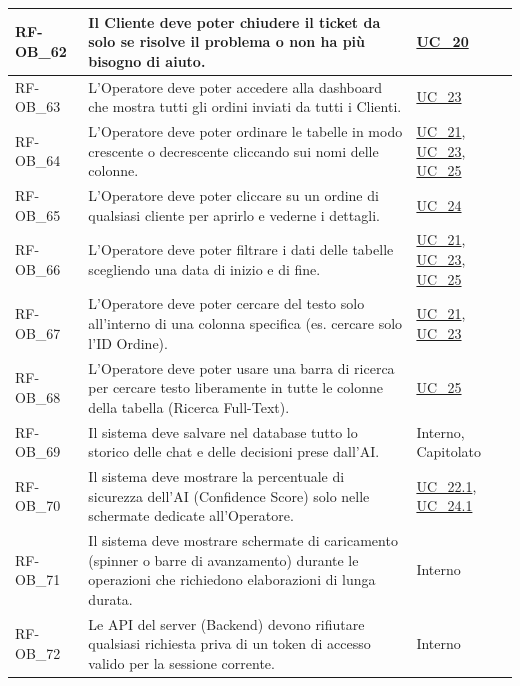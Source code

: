 \begin{longtable}{|>{\raggedright}p{}|>{\raggedright\arraybackslash}p{}|>{\raggedright\arraybackslash}p{}|}
    \hline
    RF-OB\_62 \hypertarget{rf-ob_62} & Il Cliente deve poter chiudere il ticket da solo se risolve il problema o non ha più bisogno di aiuto. & \hyperref[uc_20]{UC\_20} \\
    \hline
    RF-OB\_63 \hypertarget{rf-ob_63} & L'Operatore deve poter accedere alla dashboard che mostra tutti gli ordini inviati da tutti i Clienti. & \hyperref[uc_23]{UC\_23} \\
    \hline
    RF-OB\_64 \hypertarget{rf-ob_64} & L'Operatore deve poter ordinare le tabelle in modo crescente o decrescente cliccando sui nomi delle colonne. & \hyperref[uc_21]{UC\_21}, \hyperref[uc_23]{UC\_23}, \hyperref[uc_25]{UC\_25} \\
    \hline
    RF-OB\_65 \hypertarget{rf-ob_65} & L'Operatore deve poter cliccare su un ordine di qualsiasi cliente per aprirlo e vederne i dettagli. & \hyperref[uc_24]{UC\_24} \\
    \hline
    RF-OB\_66 \hypertarget{rf-ob_66} & L'Operatore deve poter filtrare i dati delle tabelle scegliendo una data di inizio e di fine. & \hyperref[uc_21]{UC\_21}, \hyperref[uc_23]{UC\_23}, \hyperref[uc_25]{UC\_25} \\
    \hline
    RF-OB\_67 \hypertarget{rf-ob_67} & L'Operatore deve poter cercare del testo solo all'interno di una colonna specifica (es. cercare solo l'ID Ordine). & \hyperref[uc_21]{UC\_21}, \hyperref[uc_23]{UC\_23} \\
    \hline
    RF-OB\_68 \hypertarget{rf-ob_68} & L'Operatore deve poter usare una barra di ricerca per cercare testo liberamente in tutte le colonne della tabella (Ricerca Full-Text). & \hyperref[uc_25]{UC\_25} \\
    \hline
    RF-OB\_69 \hypertarget{rf-ob_69} & Il sistema deve salvare nel database tutto lo storico delle chat e delle decisioni prese dall'AI. & Interno, Capitolato \\
    \hline
    RF-OB\_70 \hypertarget{rf-ob_70} & Il sistema deve mostrare la percentuale di sicurezza dell'AI (Confidence Score) solo nelle schermate dedicate all'Operatore. & \hyperref[uc_22.1]{UC\_22.1}, \hyperref[uc_24.1]{UC\_24.1} \\
    \hline
    RF-OB\_71 \hypertarget{rf-ob_71} & Il sistema deve mostrare schermate di caricamento (spinner o barre di avanzamento) durante le operazioni che richiedono elaborazioni di lunga durata. & Interno \\
    \hline
    RF-OB\_72 \hypertarget{rf-ob_72} & Le API del server (Backend) devono rifiutare qualsiasi richiesta priva di un token di accesso valido per la sessione corrente. & Interno \\

\end{longtable}
